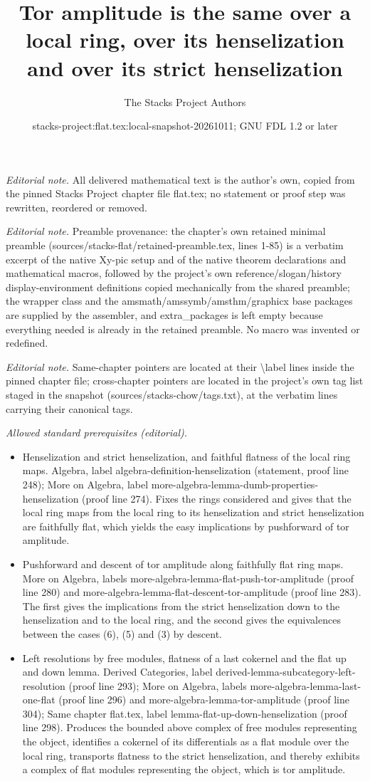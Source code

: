 \documentclass[10pt,a4paper]{amsart}
\title{Tor amplitude is the same over a local ring, over its henselization and over its strict henselization}
\author{The Stacks Project Authors}
\date{stacks-project:flat.tex:local-snapshot-20261011; GNU FDL 1.2 or later}
\theoremstyle{plain}
\theoremstyle{definition}
\theoremstyle{remark}
\numberwithin{equation}{subsection}
\begin{document}
\maketitle
\noindent\textit{Editorial note.} All delivered mathematical text is the author's own, copied from the pinned Stacks Project chapter file flat.tex; no statement or proof step was rewritten, reordered or removed.\par\medskip
\noindent\textit{Editorial note.} Preamble provenance: the chapter's own retained minimal preamble (sources/stacks-flat/retained-preamble.tex, lines 1-85) is a verbatim excerpt of the native Xy-pic setup and of the native theorem declarations and mathematical macros, followed by the project's own reference/slogan/history display-environment definitions copied mechanically from the shared preamble; the wrapper class and the amsmath/amssymb/amsthm/graphicx base packages are supplied by the assembler, and extra\_packages is left empty because everything needed is already in the retained preamble. No macro was invented or redefined.\par\medskip
\noindent\textit{Editorial note.} Same-chapter pointers are located at their \textbackslash{}label lines inside the pinned chapter file; cross-chapter pointers are located in the project's own tag list staged in the snapshot (sources/stacks-chow/tags.txt), at the verbatim lines carrying their canonical tags.\par\medskip
\noindent\textit{Allowed standard prerequisites (editorial).}\begin{itemize}
\item Henselization and strict henselization, and faithful flatness of the local ring maps. Algebra, label algebra-definition-henselization (statement, proof line 248); More on Algebra, label more-algebra-lemma-dumb-properties-henselization (proof line 274). Fixes the rings considered and gives that the local ring maps from the local ring to its henselization and strict henselization are faithfully flat, which yields the easy implications by pushforward of tor amplitude.
\item Pushforward and descent of tor amplitude along faithfully flat ring maps. More on Algebra, labels more-algebra-lemma-flat-push-tor-amplitude (proof line 280) and more-algebra-lemma-flat-descent-tor-amplitude (proof line 283). The first gives the implications from the strict henselization down to the henselization and to the local ring, and the second gives the equivalences between the cases (6), (5) and (3) by descent.
\item Left resolutions by free modules, flatness of a last cokernel and the flat up and down lemma. Derived Categories, label derived-lemma-subcategory-left-resolution (proof line 293); More on Algebra, labels more-algebra-lemma-last-one-flat (proof line 296) and more-algebra-lemma-tor-amplitude (proof line 304); Same chapter flat.tex, label lemma-flat-up-down-henselization (proof line 298). Produces the bounded above complex of free modules representing the object, identifies a cokernel of its differentials as a flat module over the local ring, transports flatness to the strict henselization, and thereby exhibits a complex of flat modules representing the object, which is tor amplitude.
\end{itemize}\medskip
\end{document}
